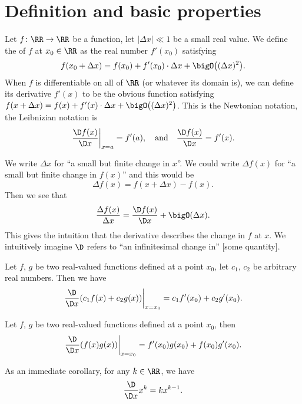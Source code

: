 
\section{Definition and basic properties}

\begin{definition}\label{calculus-0006}%
Let $f\colon\RR\to\RR$ be a function, let $|\Delta x|\ll1$ be a small
real value. We define the  of $f$ at $x_{0}\in\RR$ as
the real number $f'(x_{0})$ satisfying
\[f(x_{0}+\Delta x)=f(x_{0})+f'(x_{0})\cdot\Delta x+\bigO\bigl((\Delta x)^{2}\bigr).\]
When $f$ is differentiable on all of $\RR$ (or whatever its domain is),
we can define its derivative $f'(x)$ to be the obvious function
satisfying $f(x+\Delta x)=f(x)+f'(x)\cdot\Delta x+\bigO\bigl((\Delta x)^{2}\bigr)$.
This is the Newtonian notation, the Leibnizian notation is
\begin{equation}
\left.\frac{\D f(x)}{\D x}\right|_{x=a}=f'(a),\quad\mbox{and}\quad\frac{\D f(x)}{\D x}=f'(x).
\end{equation}
\end{definition}

\begin{node}[Notation]\label{calculus-000W}%
We write $\Delta x$ for ``a small but finite change in $x$''. We could
write $\Delta f(x)$ for ``a small but finite change in $f(x)$'' and this
would be
\[\Delta f(x) = f(x+\Delta x)-f(x).\]
Then we see that
\[\frac{\Delta f(x)}{\Delta x} = \frac{\D f(x)}{\D x}+\bigO(\Delta x).\]
This gives the intuition that the derivative describes the change in $f$
at $x$. We intuitively imagine $\D$ refers to ``an infinitesimal change in''
[some quantity].
\end{node} %

\begin{theorem}[Linearity]\label{calculus-0007}%
Let $f$, $g$ be two real-valued functions defined at a point $x_{0}$,
let $c_{1}$, $c_{2}$ be arbitrary real numbers. Then we have
\[\left.\frac{\D}{\D x}(c_{1}f(x)+c_{2}g(x))\right|_{x=x_{0}}=c_{1}f'(x_{0})+c_{2}g'(x_{0}).\]
\end{theorem} %

\begin{theorem}\label{calculus-0008}%
Let $f$, $g$ be two real-valued functions defined at a point $x_{0}$,
then
\[\left.\frac{\D}{\D x}(f(x)g(x))\right|_{x=x_{0}}=f'(x_{0})g(x_{0})+f(x_{0})g'(x_{0}).\]
\end{theorem}

\begin{node}\label{calculus-0009}%
As an immediate corollary, for any $k\in\RR$, we have
\[\frac{\D}{\D x}x^{k}=kx^{k-1}.\]
\end{node} %

